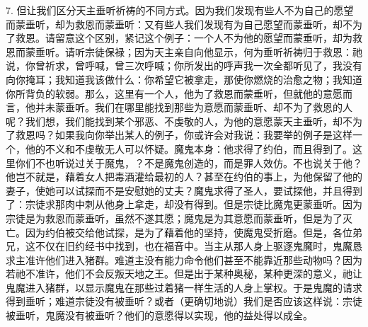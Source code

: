 7. 但让我们区分天主垂听祈祷的不同方式。因为我们发现有些人不为自己的愿望而蒙垂听，却为救恩而蒙垂听：又有些人我们发现有为自己愿望而蒙垂听，却不为了救恩。请留意这个区别，紧记这个例子：一个人不为他的愿望而蒙垂听，却为救恩而蒙垂听。请听宗徒保禄；因为天主亲自向他显示，何为垂听祈祷归于救恩：祂说，你曾祈求，曾呼喊，曾三次呼喊；你所发出的呼声我一次全都听见了，我没有向你掩耳；我知道我该做什么：你希望它被拿走，那使你燃烧的治愈之物；我知道你所背负的软弱。那么，这里有一个人，他为了救恩而蒙垂听，但就他的意愿而言，他并未蒙垂听。我们在哪里能找到那些为意愿而蒙垂听、却不为了救恩的人呢？我们想，我们能找到某个邪恶、不虔敬的人，为他的意愿蒙天主垂听，却不为了救恩吗？如果我向你举出某人的例子，你或许会对我说：我要举的例子是这样一个，他的不义和不虔敬无人可以怀疑。魔鬼本身：他求得了约伯，而且得到了。这里你们不也听说过关于魔鬼，？不是魔鬼创造的，而是罪人效仿。不也说关于他？他岂不就是，藉着女人把毒酒灌给最初的人？甚至在约伯的事上，为他保留了他的妻子，使她可以试探而不是安慰她的丈夫？魔鬼求得了圣人，要试探他，并且得到了：宗徒求那肉中刺从他身上拿走，却没有得到。但是宗徒比魔鬼更蒙垂听。因为宗徒是为救恩而蒙垂听，虽然不遂其愿；魔鬼是为其意愿而蒙垂听，但是为了灭亡。因为约伯被交给他试探，是为了藉着他的坚持，使魔鬼受折磨。但是，各位弟兄，这不仅在旧约经书中找到，也在福音中。当主从那人身上驱逐鬼魔时，鬼魔恳求主准许他们进入猪群。难道主没有能力命令他们甚至不能靠近那些动物吗？因为若祂不准许，他们不会反叛天地之王。但是出于某种奥秘，某种更深的意义，祂让鬼魔进入猪群，以显示魔鬼在那些过着猪一样生活的人身上掌权。于是鬼魔的请求得到垂听；难道宗徒没有被垂听？或者（更确切地说）我们是否应该这样说：宗徒被垂听，鬼魔没有被垂听？他们的意愿得以实现，他的益处得以成全。\par

